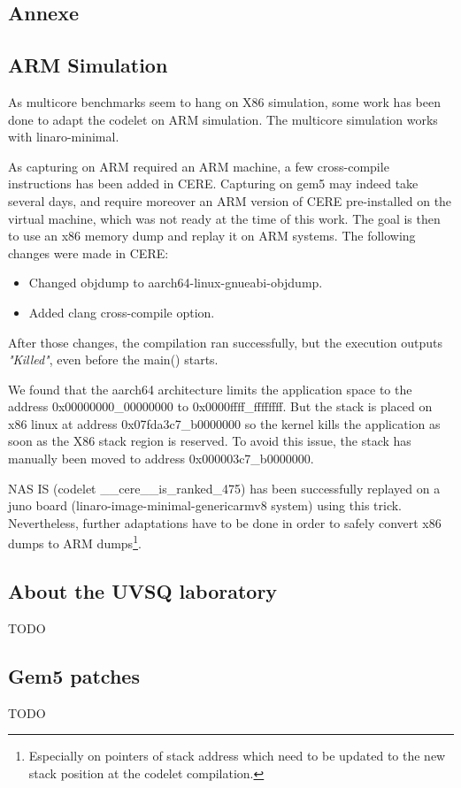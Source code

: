 \documentclass{article}
\begin{document}
\begin{multicols}{2}
\newpage





\newpage
\section{Annexe}
\subsection{ARM Simulation}
\label{ARM_sim}
As multicore benchmarks seem to hang on X86 simulation, some work has been done to adapt the codelet on ARM simulation.
The multicore simulation works with linaro-minimal.

As capturing on ARM required an ARM machine, a few cross-compile instructions has been added in CERE. Capturing on gem5 may indeed take several days, and require moreover an ARM version of CERE pre-installed on the virtual machine, which was not ready at the time of this work. The goal is then to use an x86 memory dump and replay it on ARM systems. The following changes were made in CERE:
\begin{itemize}
\item Changed objdump to aarch64-linux-gnueabi-objdump.
\item Added clang cross-compile option.
\end{itemize}

After those changes, the compilation ran successfully, but the execution outputs \textit{"Killed"}, even before the main() starts.


We found that the aarch64 architecture limits the application space to the address 0x00000000\_00000000 to 0x0000ffff\_ffffffff\cite{aarch64-mmu}.
 But the stack is placed on x86 linux at address 0x07fda3c7\_b0000000 so the kernel kills the application as soon as the X86 stack region is reserved.
To avoid this issue, the stack has manually been moved to address 0x000003c7\_b0000000.

NAS IS (codelet \_\_cere\_\_is\_ranked\_475) has been successfully replayed on a juno board (linaro-image-minimal-genericarmv8 system) using this trick. Nevertheless, further adaptations have to be done in order to safely convert x86 dumps to ARM dumps\footnote{Especially on pointers of stack address which need to be updated to the new stack position at the codelet compilation.}.


\subsection{About the UVSQ laboratory}
TODO

\subsection{Gem5 patches}
TODO

\end{multicols}
\end{document}
